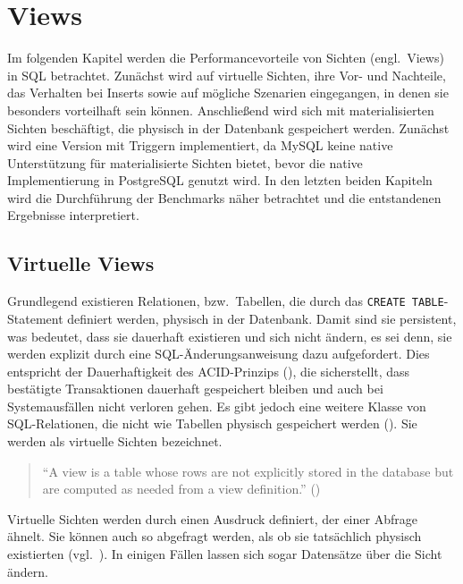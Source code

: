 
\chapter{Views}\label{ch:views}
Im folgenden Kapitel werden die Performancevorteile von Sichten (engl.\ Views) in SQL betrachtet.
Zunächst wird auf virtuelle Sichten, ihre Vor- und Nachteile, das Verhalten bei Inserts sowie auf mögliche Szenarien eingegangen, in denen sie besonders vorteilhaft sein können.
Anschließend wird sich mit materialisierten Sichten beschäftigt, die physisch in der Datenbank gespeichert werden.
Zunächst wird eine Version mit Triggern implementiert, da MySQL keine native Unterstützung für materialisierte Sichten bietet, bevor die native Implementierung in PostgreSQL genutzt wird.
In den letzten beiden Kapiteln wird die Durchführung der Benchmarks näher betrachtet und die entstandenen Ergebnisse interpretiert.

\section{Virtuelle Views}\label{sec:virtuelle-views}

Grundlegend existieren Relationen, bzw.\ Tabellen, die durch das \texttt{CREATE TABLE}-Statement definiert werden, physisch in der Datenbank.
Damit sind sie persistent, was bedeutet, dass sie dauerhaft existieren und sich nicht ändern, es sei denn, sie werden explizit durch eine SQL-Änderungsanweisung dazu aufgefordert.
Dies entspricht der Dauerhaftigkeit des ACID-Prinzips (\cite{acid_eigenschaften}), die sicherstellt, dass bestätigte Transaktionen dauerhaft gespeichert bleiben und auch bei Systemausfällen nicht verloren gehen.
Es gibt jedoch eine weitere Klasse von SQL-Relationen, die nicht wie Tabellen physisch gespeichert werden (\cite[341--349, 353--366]{garcia2008database}).
Sie werden als virtuelle Sichten bezeichnet.

\begin{quote}
    \enquote{A view is a table whose rows are not explicitly stored in the database but are computed as needed from a view definition.} (\cite[S. 86]{ramakrishnan2002database})
\end{quote}

Virtuelle Sichten werden durch einen Ausdruck definiert, der einer Abfrage ähnelt.
Sie können auch so abgefragt werden, als ob sie tatsächlich physisch existierten (vgl.\ \cite[S. 87]{ramakrishnan2002database}).
In einigen Fällen lassen sich sogar Datensätze über die Sicht ändern.

